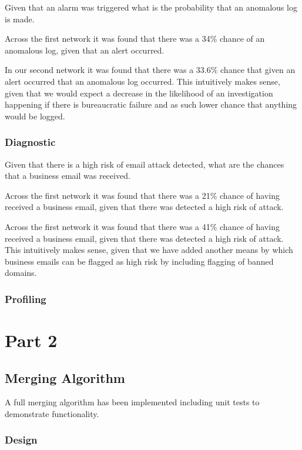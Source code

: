 \documentclass[10pt,a4paper]{article}
\begin{document}
Given that an alarm was triggered what is the probability that an anomalous log is made.

Across the first network it was found that there was a 34\% chance of an anomalous log, given that an alert occurred.

In our second network it was found that there was a 33.6\% chance that given an alert occurred that an anomalous log occurred. This intuitively makes sense, given that we would expect a decrease in the likelihood of an investigation happening if there is bureaucratic failure and as such lower chance that anything would be logged.

\subsubsection{Diagnostic}

Given that there is a high risk of email attack detected, what are the chances that a business email was received.

Across the first network it was found that there was a 21\% chance of having received a business email, given that there was detected a high risk of attack.

Across the first network it was found that there was a 41\% chance of having received a business email, given that there was detected a high risk of attack. This intuitively makes sense, given that we have added another means by which business emails can be flagged as high risk by including flagging of banned domains.

\subsubsection{Profiling}



\section{Part 2}

\subsection{Merging Algorithm}

A full merging algorithm has been implemented including unit tests to demonstrate functionality. 
\subsubsection{Design}
\end{document}
